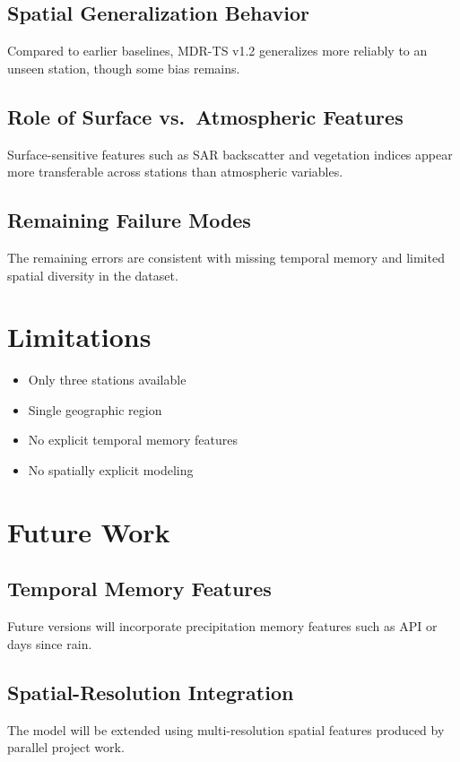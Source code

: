\documentclass[11pt]{article}
\begin{document}
\subsection{Spatial Generalization Behavior}
Compared to earlier baselines, MDR-TS v1.2 generalizes more reliably to an unseen station, though some bias remains.

\subsection{Role of Surface vs.\ Atmospheric Features}
Surface-sensitive features such as SAR backscatter and vegetation indices appear more transferable across stations than atmospheric variables.

\subsection{Remaining Failure Modes}
The remaining errors are consistent with missing temporal memory and limited spatial diversity in the dataset.

\section{Limitations}

\begin{itemize}
\item Only three stations available
\item Single geographic region
\item No explicit temporal memory features
\item No spatially explicit modeling
\end{itemize}

\section{Future Work}

\subsection{Temporal Memory Features}
Future versions will incorporate precipitation memory features such as API or days since rain.

\subsection{Spatial-Resolution Integration}
The model will be extended using multi-resolution spatial features produced by parallel project work.
\end{document}
